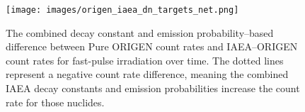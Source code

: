 \documentclass{style/nseJournal}
\begin{document}
%


\begin{figure}[]
\centering
\texttt{[image: images/origen\_iaea\_dn\_targets\_net.png]}
\caption{The combined decay constant and emission probability--based difference between Pure ORIGEN count rates and IAEA--ORIGEN count rates for  fast-pulse irradiation over time. The dotted lines represent a negative count rate difference, meaning the combined IAEA decay constants and emission probabilities increase the count rate for those nuclides.}
\label{fig:end-comp}
\end{figure}



%
\end{document}
